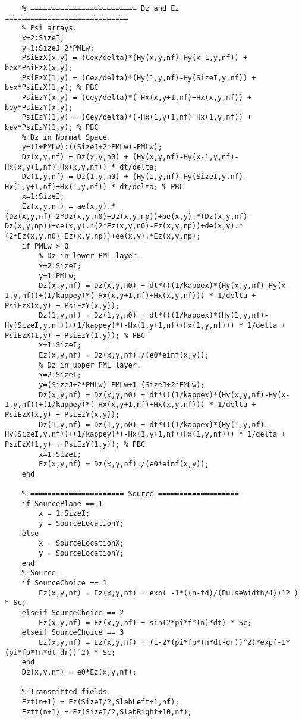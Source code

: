 \begin{lstlisting}
    % ========================= Dz and Ez =============================
    % Psi arrays.
    x=2:SizeI;
    y=1:SizeJ+2*PMLw;
    PsiEzX(x,y) = (Cex/delta)*(Hy(x,y,nf)-Hy(x-1,y,nf)) + bex*PsiEzX(x,y);
    PsiEzX(1,y) = (Cex/delta)*(Hy(1,y,nf)-Hy(SizeI,y,nf)) + bex*PsiEzX(1,y); % PBC
    PsiEzY(x,y) = (Cey/delta)*(-Hx(x,y+1,nf)+Hx(x,y,nf)) + bey*PsiEzY(x,y);
    PsiEzY(1,y) = (Cey/delta)*(-Hx(1,y+1,nf)+Hx(1,y,nf)) + bey*PsiEzY(1,y); % PBC
    % Dz in Normal Space.
    y=(1+PMLw):((SizeJ+2*PMLw)-PMLw);
    Dz(x,y,nf) = Dz(x,y,n0) + (Hy(x,y,nf)-Hy(x-1,y,nf)-Hx(x,y+1,nf)+Hx(x,y,nf)) * dt/delta;
    Dz(1,y,nf) = Dz(1,y,n0) + (Hy(1,y,nf)-Hy(SizeI,y,nf)-Hx(1,y+1,nf)+Hx(1,y,nf)) * dt/delta; % PBC
    x=1:SizeI;
    Ez(x,y,nf) = ae(x,y).*(Dz(x,y,nf)-2*Dz(x,y,n0)+Dz(x,y,np))+be(x,y).*(Dz(x,y,nf)-Dz(x,y,np))+ce(x,y).*(2*Ez(x,y,n0)-Ez(x,y,np))+de(x,y).*(2*Ez(x,y,n0)+Ez(x,y,np))+ee(x,y).*Ez(x,y,np);
    if PMLw > 0
        % Dz in lower PML layer.
        x=2:SizeI;
        y=1:PMLw;
        Dz(x,y,nf) = Dz(x,y,n0) + dt*(((1/kappex)*(Hy(x,y,nf)-Hy(x-1,y,nf))+(1/kappey)*(-Hx(x,y+1,nf)+Hx(x,y,nf))) * 1/delta + PsiEzX(x,y) + PsiEzY(x,y));
        Dz(1,y,nf) = Dz(1,y,n0) + dt*(((1/kappex)*(Hy(1,y,nf)-Hy(SizeI,y,nf))+(1/kappey)*(-Hx(1,y+1,nf)+Hx(1,y,nf))) * 1/delta + PsiEzX(1,y) + PsiEzY(1,y)); % PBC
        x=1:SizeI;
        Ez(x,y,nf) = Dz(x,y,nf)./(e0*einf(x,y));
        % Dz in upper PML layer.
        x=2:SizeI;
        y=(SizeJ+2*PMLw)-PMLw+1:(SizeJ+2*PMLw);
        Dz(x,y,nf) = Dz(x,y,n0) + dt*(((1/kappex)*(Hy(x,y,nf)-Hy(x-1,y,nf))+(1/kappey)*(-Hx(x,y+1,nf)+Hx(x,y,nf))) * 1/delta + PsiEzX(x,y) + PsiEzY(x,y));
        Dz(1,y,nf) = Dz(1,y,n0) + dt*(((1/kappex)*(Hy(1,y,nf)-Hy(SizeI,y,nf))+(1/kappey)*(-Hx(1,y+1,nf)+Hx(1,y,nf))) * 1/delta + PsiEzX(1,y) + PsiEzY(1,y)); % PBC
        x=1:SizeI;
        Ez(x,y,nf) = Dz(x,y,nf)./(e0*einf(x,y));
    end

    % ====================== Source ===================
    if SourcePlane == 1
        x = 1:SizeI;
        y = SourceLocationY;        
    else
        x = SourceLocationX;
        y = SourceLocationY;
    end
    % Source.
    if SourceChoice == 1
        Ez(x,y,nf) = Ez(x,y,nf) + exp( -1*((n-td)/(PulseWidth/4))^2 ) * Sc;
    elseif SourceChoice == 2
        Ez(x,y,nf) = Ez(x,y,nf) + sin(2*pi*f*(n)*dt) * Sc;
    elseif SourceChoice == 3
        Ez(x,y,nf) = Ez(x,y,nf) + (1-2*(pi*fp*(n*dt-dr))^2)*exp(-1*(pi*fp*(n*dt-dr))^2) * Sc;
    end
    Dz(x,y,nf) = e0*Ez(x,y,nf);

    % Transmitted fields.
    Ezt(n+1) = Ez(SizeI/2,SlabLeft+1,nf);
    Eztt(n+1) = Ez(SizeI/2,SlabRight+10,nf);


\end{lstlisting}
